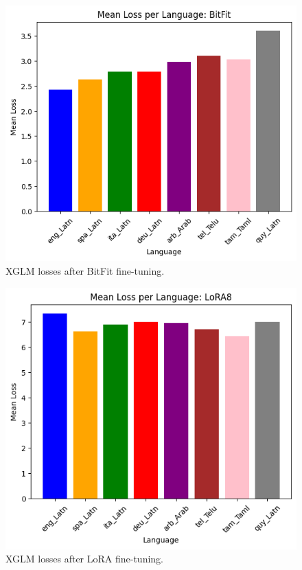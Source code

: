 \documentclass[11pt]{article}
\begin{document}
\begin{figure}[ht]
\centering
\includegraphics[width=0.9\columnwidth]{loss_bitfit.png}
\caption{XGLM losses after BitFit fine-tuning.}
\label{loss_bitfit}
\end{figure}

\begin{figure}[ht]
\centering
\includegraphics[width=0.9\columnwidth]{loss_lora8.png}
\caption{XGLM losses after LoRA fine-tuning.}
\label{loss_lora}
\end{figure}
\end{document}
